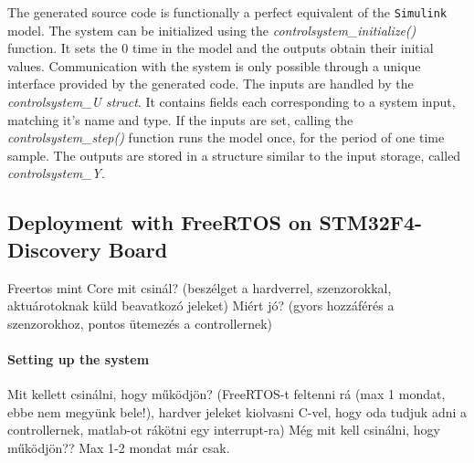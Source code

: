 The generated source code is functionally a perfect equivalent of the \verb!Simulink! model. The system can be initialized using the \emph{controlsystem\_initialize()} function. It sets the 0 time in the model and the outputs obtain their initial values. Communication with the system is only possible through a unique interface provided by the generated code. The inputs are handled by the \emph{controlsystem\_U struct}. It contains fields each corresponding to a system input, matching it's name and type. If the inputs are set, calling the \emph{controlsystem\_step()} function runs the model once, for the period of one time sample. The outputs are stored in a structure similar to the input storage, called \emph{controlsystem\_Y}.

\subsection{Deployment with FreeRTOS on STM32F4-Discovery Board}

Freertos mint Core mit csinál? (beszélget a hardverrel, szenzorokkal, aktuárotoknak küld beavatkozó jeleket)
Miért jó? (gyors hozzáférés a szenzorokhoz, pontos ütemezés a controllernek)

\paragraph{Setting up the system}

Mit kellett csinálni, hogy működjön? (FreeRTOS-t feltenni rá (max 1 mondat, ebbe nem megyünk bele!), hardver jeleket kiolvasni C-vel, hogy oda tudjuk adni a controllernek, matlab-ot rákötni egy interrupt-ra)
Még mit kell csinálni, hogy működjön?? Max 1-2 mondat már csak.